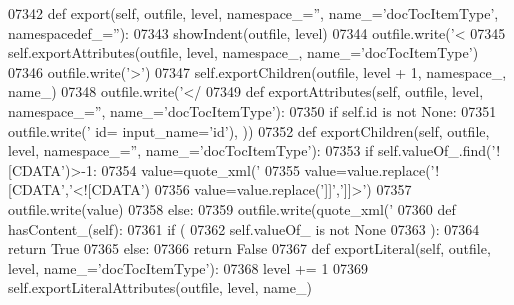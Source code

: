 \begin{DoxyCode}
{{{{{{{{{{{{{{{{{{{{{{{{{{{{{{{{{{{{{{{{{{{{{{{{{{{{{{{{{{{{{{{{{{{{{{{{{{{{{{{{{{{{{{{{{{{{{{{{{{{{{{{{{{{{{{{{{{{{{{{{{{{{{{{{{{{{{{{{{{{{{{{{{{{{{{{{{{{{{{{{{{{{{{{{{{{{{{{{{{{{{{{{{{{{{{{{{{{{{{{{{{{{{{{{{{{{{{{{{{{{{{{{{{{{{{{{{{{{{{{{{{{{{{{{{{{{{{{{{{{{{{{{{{{{{{{{{{{{{{{{{{{{{{{{{{{{{{{{{{{{{{{{{{{{{{{{{{{{{{{{{{{{{{{{{{{{{{{{{{{{{{{{{{{{{{{{{{{{{{{{{{{{{{{{{{{{{{{{{{{{{{{{{{{{{{{{{{{{{{{{{{{{{{{{{{{{{{{{{{{{{{{{{{{{{{{{{{{{{{{{{{{{{{{{{{{{{{{{{{{{{07342     \textcolor{keyword}{def }export(self, outfile, level, namespace\_='', name\_='docTocItemType', namespacedef\_=''):
07343         showIndent(outfile, level)
07344         outfile.write(\textcolor{stringliteral}{'<%
07345         self.exportAttributes(outfile, level, namespace\_, name\_=\textcolor{stringliteral}{'docTocItemType'})
07346         outfile.write(\textcolor{stringliteral}{'>'})
07347         self.exportChildren(outfile, level + 1, namespace\_, name\_)
07348         outfile.write(\textcolor{stringliteral}{'</%
07349     \textcolor{keyword}{def }exportAttributes(self, outfile, level, namespace\_='', name\_='docTocItemType'):
07350         \textcolor{keywordflow}{if} self.id \textcolor{keywordflow}{is} \textcolor{keywordflow}{not} \textcolor{keywordtype}{None}:
07351             outfile.write(\textcolor{stringliteral}{' id=%
      input\_name=\textcolor{stringliteral}{'id'}), ))
07352     \textcolor{keyword}{def }exportChildren(self, outfile, level, namespace\_='', name\_='docTocItemType'):
07353         \textcolor{keywordflow}{if} self.valueOf\_.find(\textcolor{stringliteral}{'![CDATA'})>-1:
07354             value=quote_xml(\textcolor{stringliteral}{'%
07355             value=value.replace(\textcolor{stringliteral}{'![CDATA'},\textcolor{stringliteral}{'<![CDATA'})
07356             value=value.replace(\textcolor{stringliteral}{']]'},\textcolor{stringliteral}{']]>'})
07357             outfile.write(value)
07358         \textcolor{keywordflow}{else}:
07359             outfile.write(quote_xml(\textcolor{stringliteral}{'%
07360     \textcolor{keyword}{def }hasContent_(self):
07361         \textcolor{keywordflow}{if} (
07362             self.valueOf_ \textcolor{keywordflow}{is} \textcolor{keywordflow}{not} \textcolor{keywordtype}{None}
07363             ):
07364             \textcolor{keywordflow}{return} \textcolor{keyword}{True}
07365         \textcolor{keywordflow}{else}:
07366             \textcolor{keywordflow}{return} \textcolor{keyword}{False}
07367     \textcolor{keyword}{def }exportLiteral(self, outfile, level, name\_='docTocItemType'):
07368         level += 1
07369         self.exportLiteralAttributes(outfile, level, name\_)
}}}}}}}}}}}}}}}}}}}}}}}}}}}}}}}}}}}}}}}}}}}}}}}}}}}}}}}}}}}}}}}}}}}}}}}}}}}}}}}}}}}}}}}}}}}}}}}}}}}}}}}}}}}}}}}}}}}}}}}}}}}}}}}}}}}}}}}}}}}}}}}}}}}}}}}}}}}}}}}}}}}}}}}}}}}}}}}}}}}}}}}}}}}}}}}}}}}}}}}}}}}}}}}}}}}}}}}}}}}}}}}}}}}}}}}}}}}}}}}}}}}}}}}}}}}}}}}}}}}}}}}}}}}}}}}}}}}}}}}}}}}}}}}}}}}}}}}}}}}}}}}}}}}}}}}}}}}}}}}}}}}}}}}}}}}}}}}}}}}}}}}}}}}}}}}}}}}}}}}}}}}}}}}}}}}}}}}}}}}}}}}}}}}}}}}}}}}}}}}}}}}}}}}}}}}}}}}}}}}}}}}}}}}}}}}}}}}}}}}}}}}}}}}}}}}}}}}}}}}}}}}}}}
\end{DoxyCode}
